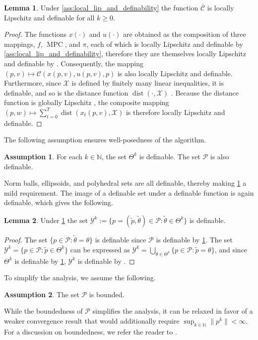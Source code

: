 \documentclass[journal,twoside,web,final]{ieeecolor}
\theoremstyle{definition}
\newtheorem{assumption}{Assumption}
\newtheorem{lemma}{Lemma}
\newcommand{\N}{\mathbb{N}}
\begin{document}
%
\begin{lemma}\label{lemma:path_diff_cost}
Under \cref{ass:local_lip_and_definability} the function $\bar{\mathcal{C}}$ is locally Lipschitz and definable for all $k\geq 0$.
\end{lemma}
\begin{proof}
The functions $x(\cdot)$ and $u(\cdot)$ are obtained as the composition of three mappings, $f$, $\operatorname{MPC}$, and $\pi$, each of which is locally Lipschitz and definable by \cref{ass:local_lip_and_definability}, therefore they are themselves locally Lipschitz and definable by \cite[Exercise 1.11]{coste1999introduction}.
Consequently, the mapping $(p,v)\mapsto\mathcal{C}(x(p,v),u(p,v),p)$ is also locally Lipschitz and definable.
Furthermore, since $\mathcal{X}$ is defined by finitely many linear inequalities, it is definable, and so is the distance function $\operatorname*{dist}(\cdot,\mathcal{X})$ \cite[Exercise 1.15]{coste1999introduction}.
Because the distance function is globally Lipschitz \cite[Proposition 2.4.1]{clarke1990optimization}, the composite mapping $(p,w)\mapsto \sum_{t=0}^{T} \operatorname*{dist}(x_t(p,v),\mathcal{X})$ is therefore locally Lipschitz and definable.
\end{proof}
%
The following assumption ensures well-posedness of the algorithm.
\begin{assumption}\label{ass:path_diff_set}
For each $k\in\N$, the set $\Theta^k$ is definable. The set $\mathcal{P}$ is also definable.
\end{assumption}
%
Norm balls, ellipsoids, and polyhedral sets are all definable, thereby making \cref{ass:path_diff_set} a mild requirement. 
The image of a definable set under a definable function is again definable, which gives the following.
%
\begin{lemma}\label{lemma:Yk_is_definable}
Under \cref{ass:path_diff_set} the set $\mathcal{Y}^k:=\{ p=(\tilde{p},\tilde{\theta})\in \mathcal{P}: \tilde{\theta} \in \Theta^k \}$ is definable.
\end{lemma}
%
\begin{proof}
The set $\{ p \in \mathcal{P} : \tilde{\theta} = \theta \}$ is definable since $\mathcal{P}$ is definable by \cref{ass:path_diff_set}. 
The set $\mathcal{Y}^k = \{ p \in \mathcal{P}: \tilde{p} \in \Theta^k \}$ can be expressed as $\mathcal{Y}^k = \bigcup_{\theta \in \Theta^k} \{ p \in \mathcal{P} : \tilde{p} = \theta \}$, and since $\Theta^k$ is definable by \cref{ass:path_diff_set}, $\mathcal{Y}^k$ is definable by \cite[Theorem 1.13]{coste1999introduction}.
\end{proof}
%
To simplify the analysis, we assume the following.
\begin{assumption}\label{ass:P_bounded}
The set $\mathcal{P}$ is bounded.
\end{assumption}
%
While the boundedness of $\mathcal{P}$ simplifies the analysis, it can be relaxed in favor of a weaker convergence result that would additionally require $\sup_{k\in\N} \|p^k\| < \infty$. For a discussion on boundedness, we refer the reader to \cite[Section 6.1]{davis2020stochastic}.
\end{document}

